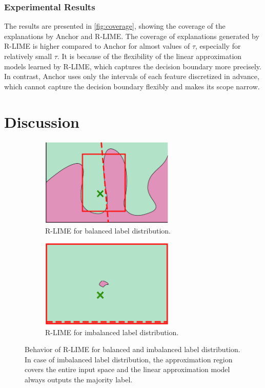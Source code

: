 \documentclass[runningheads]{llncs}
\begin{document}
\subsubsection{Experimental Results}
The results are presented in \cref{fig:coverage},
showing the coverage of the explanations by Anchor and R-LIME\@.
The coverage of explanations generated by R-LIME is higher compared to Anchor
for almost values of $\tau$, especially for relatively small $\tau$.
It is because of the flexibility of the linear approximation models learned by
R-LIME, which captures the decision boundary more precisely.
In contrast,
Anchor uses only the intervals of each feature discretized in advance,
which cannot capture the decision boundary flexibly and makes its scope narrow.


\section{Discussion}
 {%
  \def\imgwidth{0.47\textwidth}
  \begin{figure}[t]
    \centering
    \begin{subfigure}[t]{\imgwidth}
      \centering
      \includegraphics[width=0.7\textwidth]{src/img/visual-rlime3}
      \caption{R-LIME for balanced label distribution.}
    \end{subfigure}
    \begin{subfigure}[t]{\imgwidth}
      \centering
      \includegraphics[width=0.7\textwidth]{src/img/visual-rlime-imbalanced}
      \caption{R-LIME for imbalanced label distribution.
      }
    \end{subfigure}
    \caption[Behavior of R-LIME for balanced and imbalanced label distribution]{%
      Behavior of R-LIME for balanced and imbalanced label distribution.
      In case of imbalanced label distribution,
      the approximation region covers the entire input space and the
      linear approximation model always outputs the majority label.
    }\label{fig:imbalanced}
  \end{figure}
 }
\end{document}
